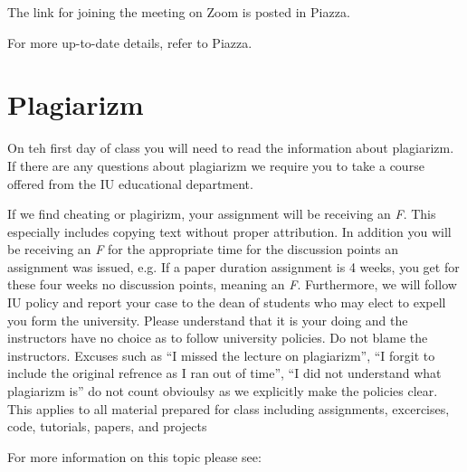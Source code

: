 The link for joining the meeting on Zoom is posted in Piazza.



For more up-to-date details, refer to Piazza.

\section{Plagiarizm}

On teh first day of class you will need to read the information about
plagiarizm. If there are any questions about plagiarizm we require you
to take a course offered from the IU educational department.

\begin{WARNING}
  If we find cheating or plagirizm, your assignment will be receiving
  an {\em F}. This especially includes copying text without proper
  attribution. In addition you will be receiving an {\em F} for the
  appropriate time for the discussion points an assignment was issued,
  e.g. If a paper duration assignment is 4 weeks, you get for these
  four weeks no discussion points, meaning an {\em F}. Furthermore, we
  will follow IU policy and report your case to the dean of students
  who may elect to expell you form the university. Please understand
  that it is your doing and the instructors have no choice as to
  follow university policies. Do not blame the instructors. Excuses
  such as ``I missed the lecture on plagiarizm'', ``I forgit to
  include the original refrence as I ran out of time'', ``I did not
  understand what plagiarizm is'' do not count obvioulsy as we
  explicitly make the policies clear. This applies to all material
  prepared for class including assignments, excercises, code,
  tutorials, papers, and projects
\end{WARNING}

For more information on this topic please see:

